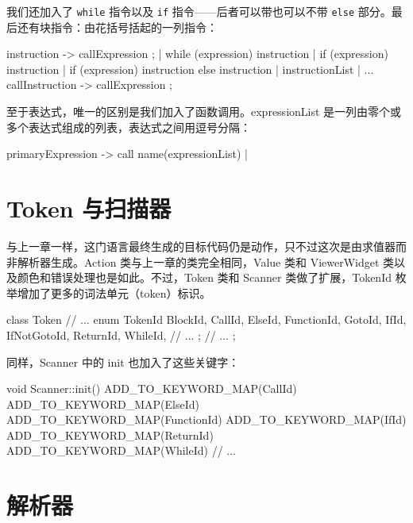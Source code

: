 我们还加入了 \texttt{while} 指令以及 \texttt{if} 指令——后者可以带也可以不带 \texttt{else} 部分。最后还有块指令：由花括号括起的一列指令：

\begin{codebox}
instruction -> callExpression ;
             | while (expression) instruction
             | if (expression) instruction
             | if (expression) instruction else instruction
             | { instructionList }
             | ...
callInstruction -> callExpression ;
\end{codebox}

至于表达式，唯一的区别是我们加入了函数调用。expressionList 是一列由零个或多个表达式组成的列表，表达式之间用逗号分隔：

\begin{codebox}
primaryExpression -> call name(expressionList)
                   |
\end{codebox}

\section{Token 与扫描器}

与上一章一样，这门语言最终生成的目标代码仍是动作，只不过这次是由求值器而非解析器生成。Action 类与上一章的类完全相同，Value 类和 ViewerWidget 类以及颜色和错误处理也是如此。不过，Token 类和 Scanner 类做了扩展，TokenId 枚举增加了更多的词法单元（token）标识。

\medskip{}

\begin{codebox}
class Token {
  // ...
  enum TokenId {BlockId, CallId, ElseId, FunctionId, GotoId,
                IfId, IfNotGotoId, ReturnId, WhileId, // ...
               };
  // ...
};
\end{codebox}

同样，Scanner 中的 init 也加入了这些关键字：

\medskip{}

\begin{codebox}
void Scanner::init() {
  ADD_TO_KEYWORD_MAP(CallId)
  ADD_TO_KEYWORD_MAP(ElseId)
  ADD_TO_KEYWORD_MAP(FunctionId)
  ADD_TO_KEYWORD_MAP(IfId)
  ADD_TO_KEYWORD_MAP(ReturnId)
  ADD_TO_KEYWORD_MAP(WhileId)
// ...
}
\end{codebox}

\section{解析器}

